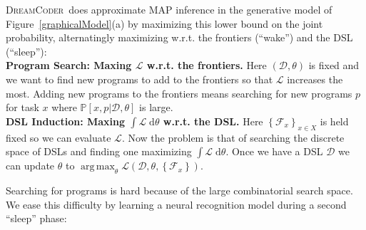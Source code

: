 \documentclass{article}
\newcommand{\system}{\textsc{DreamCoder}~}
\newcommand{\lowerBound}{\mathscr{L}}
\DeclareMathOperator*{\argmax}{arg\,max} %
\newcommand{\probability}{\mathds{P}} %
\begin{document}

\system does approximate MAP inference in the generative model of Figure~\ref{graphicalModel}(a) by maximizing this lower bound on the joint probability,
alternatingly maximizing w.r.t. the frontiers (``wake'') and the DSL (``sleep''):
\\\noindent \textbf{Program Search: Maxing $\lowerBound$ w.r.t. the frontiers.} Here $(\mathcal{D},\theta)$ is fixed and we
want to find new programs to add to  the frontiers so that $\lowerBound$ increases the most.
Adding new programs to the frontiers means searching for new programs $p$ for task $x$
where $\probability[x,p|\mathcal{D},\theta]$ is large.
\\\noindent \textbf{DSL Induction: Maxing $\int \lowerBound\;\mathrm{d}\theta$ w.r.t. the DSL.} Here $\left\{\mathcal{F}_x \right\}_{x\in X}$ is held fixed so we can evaluate $\lowerBound$. Now the problem is that of searching the discrete space of DSLs and finding one maximizing $\int \lowerBound\;\mathrm{d}\theta$.
Once we have a DSL $\mathcal{D}$ we can update $\theta$ to $\argmax_\theta \lowerBound(\mathcal{D},\theta,\left\{\mathcal{F}_x \right\})$. 


Searching for programs is hard because
of the large combinatorial search space. We ease this difficulty by learning a neural recognition model
during a second ``sleep'' phase:
\end{document}
